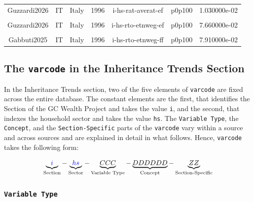 \documentclass[
]{article}
\begin{document}
\begin{table}
{\begin{tabular}[t]{ccccccc}
Guzzardi2026 & IT & Italy & 1996 & i-hs-rat-averat-ef & p0p100 & 1.030000e-02\\
\cellcolor{gray!10}{Acciari2021} & \cellcolor{gray!10}{IT} & \cellcolor{gray!10}{Italy} & \cellcolor{gray!10}{1996} & \cellcolor{gray!10}{i-hs-rto-etnwea-ff} & \cellcolor{gray!10}{p0p100} & \cellcolor{gray!10}{6.890000e-02}\\
Guzzardi2026 & IT & Italy & 1996 & i-hs-rto-etnweg-ef & p0p100 & 7.660000e-02\\
\cellcolor{gray!10}{Acciari2021} & \cellcolor{gray!10}{IT} & \cellcolor{gray!10}{Italy} & \cellcolor{gray!10}{1996} & \cellcolor{gray!10}{i-hs-rto-etnweg-ff} & \cellcolor{gray!10}{p0p100} & \cellcolor{gray!10}{8.590000e-02}\\
\addlinespace
Gabbuti2025 & IT & Italy & 1996 & i-hs-rto-etnweg-ff & p0p100 & 7.910000e-02\\
\bottomrule
\end{tabular}}
\end{table}

\subsection{\texorpdfstring{The \texttt{varcode} in the Inheritance
Trends
Section}{The varcode in the Inheritance Trends Section}}\label{subsec:inhe_varcode}

In the Inheritance Trends section, two of the five elements of
\texttt{varcode} are fixed across the entire database. The constant
elements are the first, that identifies the Section of the GC Wealth
Project and takes the value \texttt{i}, and the second, that indexes the
household sector and takes the value \texttt{hs}. The
\texttt{Variable\ Type}, the \texttt{Concept}, and the
\texttt{Section-Specific} parts of the \texttt{varcode} vary within a
source and across sources and are explained in detail in what follows.
Hence, \texttt{varcode} takes the following form:

\begin{equation}
\notag \underbrace{\textcolor{blue}{i}}_{\text{Section}} - \underbrace{\textcolor{blue}{hs}}_{\text{Sector}} - \underbrace{CCC}_{\text{Variable Type}} -     \underbrace{DDDDDD }_{\text{Concept}} - \underbrace{ZZ}_{\text{Section-Specific}}
\end{equation}

\clearpage

\subsubsection{\texorpdfstring{\texttt{Variable\ Type}}{Variable Type}}\label{variable-type}
\end{document}
